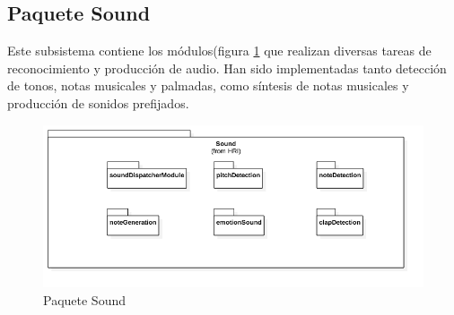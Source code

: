 \newpage

\subsection{Paquete Sound}
Este subsistema contiene los módulos(figura \ref{fig:sound-package} que realizan diversas tareas de reconocimiento y producción de audio.  Han sido implementadas tanto detección de tonos, notas musicales y palmadas, como síntesis de notas musicales y producción de sonidos prefijados.
\begin{figure}
	\centering
	\includegraphics[width=1\linewidth]{imagenes/diagramas/Sound.png}
	\caption{Paquete Sound}
	\label{fig:sound-package}
\end{figure}
